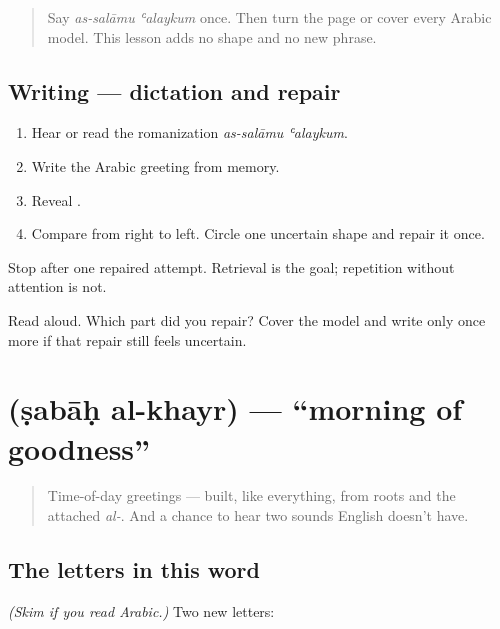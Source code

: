 \label{lesson:AR-W00-full-greeting-recall}



\begin{quote}
Say \emph{as-salāmu ʿalaykum} once. Then turn the page or cover every Arabic model. This lesson adds no shape and no new phrase.
\end{quote}

\subsection*{Writing — dictation and repair}
\begin{enumerate}
\raggedright
  \item Hear or read the romanization \emph{as-salāmu ʿalaykum}.
  \item Write the Arabic greeting from memory.
  \item Reveal \textbf{ }.
  \item Compare from right to left. Circle one uncertain shape and repair it once.
\end{enumerate}

Stop after one repaired attempt. Retrieval is the goal; repetition without attention is not.

\begin{tcolorbox}[breakable,colback=teal!4,colframe=teal!35!black,title={Before you move on}]
Read \textbf{ } aloud. Which part did you repair? Cover the model and write only \textbf{} once more if that repair still feels uncertain.
\end{tcolorbox}
\section[\texorpdfstring{\ar{صباح} \ar{الخير} (ṣabāḥ al-khayr)}{صباح الخير (ṣabāḥ al-khayr)}]{  (ṣabāḥ al-khayr) — \textquotedblleft{}morning of goodness\textquotedblright{}}

\label{lesson:AR-C01-sabah-al-khayr}



\begin{quote}
Time-of-day greetings — built, like everything, from roots and the attached \emph{al-}. And a chance to hear two sounds English doesn't have.
\end{quote}

\subsection*{The letters in this word}
\emph{(Skim if you read Arabic.)} Two new letters:


